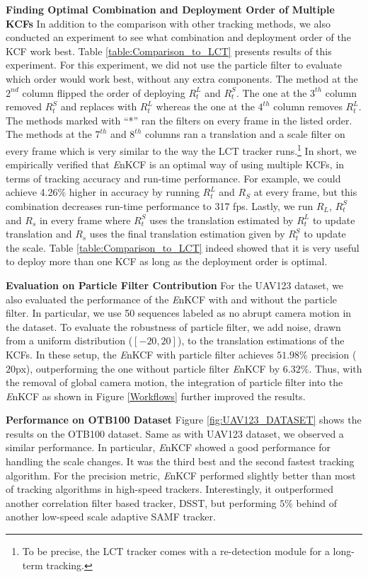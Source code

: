 \documentclass[10pt,twocolumn,letterpaper]{article}
\begin{document}
\textbf{Finding Optimal Combination and Deployment Order of Multiple
  KCFs} In addition to the comparison with other tracking methods, we
also conducted an experiment to see what combination and deployment
order of the KCF work best. Table \ref{table:Comparison_to_LCT}
presents results of this experiment. For this experiment, we did not
use the particle filter to evaluate which order would work best,
without any extra components. The method at the $2^{nd}$ column
flipped the order of deploying $R_{t}^{L}$ and $R_{t}^{S}$. The one at
the $3^{th}$ column removed $R_{t}^{S}$ and replaces with $R_{t}^{L}$
whereas the one at the $4^{th}$ column removes $R_{t}^{L}$. The
methods marked with ``*'' ran the filters on every frame in the listed
order. The methods at the $7^{th}$ and $8^{th}$ columns ran a
translation and a scale filter on every frame which is very similar to
the way the LCT tracker \cite{ma2015long} runs.\footnote{To be
  precise, the LCT tracker comes with a re-detection module for a
  long-term tracking.} In short, we empirically verified that
\textit{E}nKCF is an optimal way of using multiple KCFs, in terms of
tracking accuracy and run-time performance. For example, we could
achieve 4.26\% higher in accuracy by running $R_{t}^{L}$ and $R_{S}$
at every frame, but this combination decreases run-time performance to
317 fps. Lastly, we run $R_{L}$, $R_{t}^{S}$ and $R_{s}$ in every
frame where $R_{t}^{S}$ uses the translation estimated by $R_{t}^{L}$
to update translation and $R_{s}$ uses the final translation
estimation given by $R_{t}^{S}$ to update the scale. Table
\ref{table:Comparison_to_LCT} indeed showed that it is very useful to
deploy more than one KCF as long as the deployment order is optimal.

\textbf{Evaluation on Particle Filter Contribution} For the UAV123
dataset, we also evaluated the performance of the {\it E}nKCF with and
without the particle filter. In particular, we use 50 sequences
labeled as no abrupt camera motion in the dataset. To evaluate the
robustness of particle filter, we add noise, drawn from a uniform
distribution ($[-20,20]$), to the translation estimations of the
KCFs. In these setup, the {\it E}nKCF with particle filter achieves
$51.98\%$ precision ($20$px), outperforming the one without particle
filter {\it E}nKCF by $6.32\%$. Thus, with the removal of global
camera motion, the integration of particle filter into the {\it E}nKCF
as shown in Figure \ref{Workflows} further improved the results.

\textbf{Performance on OTB100 Dataset} Figure \ref{fig:UAV123_DATASET}
shows the results on the OTB100 dataset. Same as with UAV123 dataset,
we observed a similar performance. In particular, {\it E}nKCF showed a
good performance for handling the scale changes. It was the third best
and the second fastest tracking algorithm. For the precision metric,
{\it E}nKCF performed slightly better than most of tracking algorithms
in high-speed trackers. Interestingly, it outperformed another
correlation filter based tracker, DSST, but performing $5\%$ behind of
another low-speed scale adaptive SAMF tracker.
\end{document}
